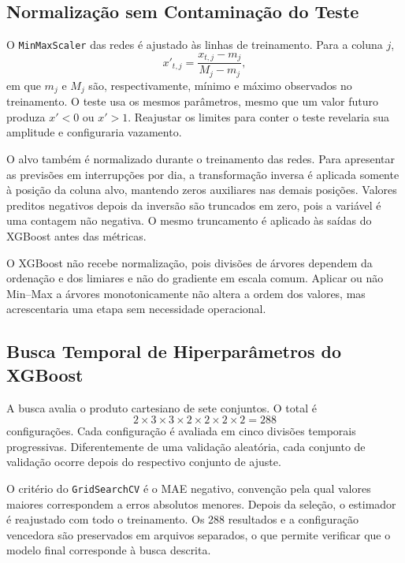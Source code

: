 \subsection{Normalização sem Contaminação do Teste}

O \texttt{MinMaxScaler} das redes é ajustado às linhas de treinamento. Para a coluna $j$,
\begin{equation}
    x'_{t,j}=\frac{x_{t,j}-m_j}{M_j-m_j},
\end{equation}
em que $m_j$ e $M_j$ são, respectivamente, mínimo e máximo observados no treinamento. O teste usa os mesmos parâmetros, mesmo que um valor futuro produza $x'<0$ ou $x'>1$. Reajustar os limites para conter o teste revelaria sua amplitude e configuraria vazamento.

O alvo também é normalizado durante o treinamento das redes. Para apresentar as previsões em interrupções por dia, a transformação inversa é aplicada somente à posição da coluna alvo, mantendo zeros auxiliares nas demais posições. Valores preditos negativos depois da inversão são truncados em zero, pois a variável é uma contagem não negativa. O mesmo truncamento é aplicado às saídas do XGBoost antes das métricas.

O XGBoost não recebe normalização, pois divisões de árvores dependem da ordenação e dos limiares e não do gradiente em escala comum. Aplicar ou não Min--Max a árvores monotonicamente não altera a ordem dos valores, mas acrescentaria uma etapa sem necessidade operacional.

\subsection{Busca Temporal de Hiperparâmetros do XGBoost}

A busca avalia o produto cartesiano de sete conjuntos. O total é
\begin{equation}
  2\times3\times3\times2\times2\times2\times2=288
\end{equation}
configurações. Cada configuração é avaliada em cinco divisões temporais progressivas. Diferentemente de uma validação aleatória, cada conjunto de validação ocorre depois do respectivo conjunto de ajuste.

O critério do \texttt{GridSearchCV} é o MAE negativo, convenção pela qual valores maiores correspondem a erros absolutos menores. Depois da seleção, o estimador é reajustado com todo o treinamento. Os 288 resultados e a configuração vencedora são preservados em arquivos separados, o que permite verificar que o modelo final corresponde à busca descrita.

